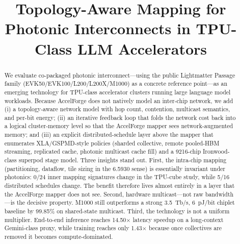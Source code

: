 \documentclass[conference]{IEEEtran}
\newcommand{\pjbit}{pJ/bit}
\newcommand{\tbps}{Tb/s}
\begin{document}
\title{Topology-Aware Mapping for Photonic Interconnects in TPU-Class LLM Accelerators}

\author{
\and
{}
}

\maketitle

\begin{abstract}
We evaluate co-packaged photonic interconnect---using the public
Lightmatter Passage family (EVK50/EVK100/L200/L200X/M1000) as a concrete
reference point---as an emerging technology for TPU-class accelerator
clusters running large language model workloads. Because AccelForge does
not natively model an inter-chip network, we add (i) a topology-aware
network model with hop count, contention, multicast semantics, and
per-bit energy; (ii) an iterative feedback loop that folds the
network cost back into a logical cluster-memory level so that the
AccelForge mapper sees network-augmented memory; and (iii) an explicit
distributed-schedule layer above the mapper that enumerates
XLA/GSPMD-style policies (sharded collective, remote pooled-HBM
streaming, replicated cache, photonic multicast cache fill) and a
9216-chip Ironwood-class superpod stage model. Three insights stand
out. First, the intra-chip mapping (partitioning, dataflow, tile
sizing in the 6.5930 sense) is essentially invariant under photonics:
0/24 inner mapping signatures change in the TPU-cube study, while
5/16 distributed schedules change. The benefit therefore lives almost
entirely in a layer that the AccelForge mapper does not see. Second,
hardware multicast---not raw bandwidth---is the decisive property.
M1000 still outperforms a strong 3.5~\tbps{}, 6~\pjbit{} chiplet
baseline by 99.85\% on shared-state multicast. Third, the technology
is not a uniform multiplier. End-to-end inference reaches
14.50$\times$ latency speedup on a long-context Gemini-class proxy,
while training reaches only 1.43$\times$ because once collectives are
removed it becomes compute-dominated.
\end{abstract}
\end{document}
